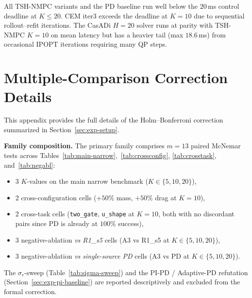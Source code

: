 \documentclass[11pt,onecolumn,a4paper]{article}
\newcommand{\Nm}{N_{\mathrm{MC}}}
\begin{document}
\begin{appendices}
\begin{table}[t]
\centering
\caption{Per-step latency ($\Nm = 40$, milliseconds).}\label{tab:latency-app}
\end{table}

All TSH-NMPC variants and the PD baseline run well below the
$20\,$ms control deadline at $K \le 20$. CEM iter$3$ exceeds the
deadline at $K = 10$ due to sequential rollout--refit iterations.
The CasADi $H{=}20$ solver runs at parity with TSH-NMPC $K{=}10$
on mean latency but has a heavier tail (max $18.6\,$ms) from
occasional IPOPT iterations requiring many QP steps.

\section{Multiple-Comparison Correction Details}\label{app:multiplicity}

This appendix provides the full details of the Holm--Bonferroni
correction summarized in Section~\ref{sec:exp-setup}.

\textbf{Family composition.}
The primary family comprises $m = 13$ paired McNemar tests across
Tables~\ref{tab:main-narrow},~\ref{tab:crossconfig},
\ref{tab:crosstask}, and~\ref{tab:negabl}:
\begin{itemize}
\item 3 $K$-values on the main narrow benchmark
      ($K \in \{5, 10, 20\}$),
\item 2 cross-configuration cells
      ($+50\%$ mass, $+50\%$ drag at $K = 10$),
\item 2 cross-task cells
      (\texttt{two\_gate}, \texttt{u\_shape} at $K = 10$,
       both with no discordant pairs since PD is already at $100\%$
       success),
\item 3 negative-ablation \emph{vs R1\_s5} cells
      (A3 vs R1\_s5 at $K \in \{5, 10, 20\}$),
\item 3 negative-ablation \emph{vs single-source PD} cells
      (A3 vs PD at $K \in \{5, 10, 20\}$).
\end{itemize}
The $\sigma_r$-sweep (Table~\ref{tab:sigma-sweep}) and the PI-PD /
Adaptive-PD refutation (Section~\ref{sec:exp-pi-baseline}) are reported
descriptively and excluded from the formal correction.


\end{appendices}
\end{document}

